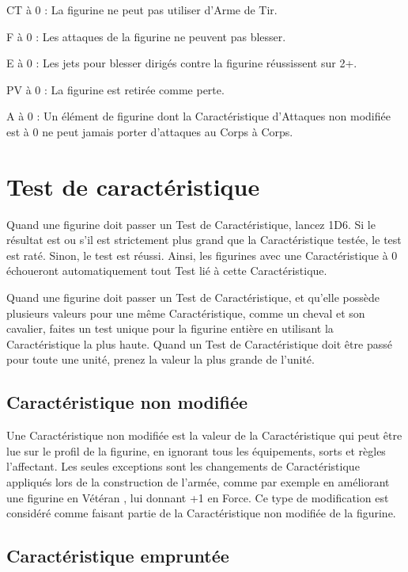 \noindent CT à 0 : La figurine ne peut pas utiliser d'Arme de Tir.

\noindent F à 0 : Les attaques de la figurine ne peuvent pas blesser.

\noindent E à 0 : Les jets pour blesser dirigés contre la figurine réussissent sur 2+.

\noindent PV à 0 : La figurine est retirée comme perte.

\noindent A à 0 : Un élément de figurine dont la Caractéristique d'Attaques non modifiée est à 0 ne peut jamais porter d'attaques au Corps à Corps.

\section{Test de caractéristique}

Quand une figurine doit passer un Test de Caractéristique, lancez 1D6. Si le résultat est  ou s'il est strictement plus grand que la Caractéristique testée, le test est raté. Sinon, le test est réussi. Ainsi, les figurines avec une Caractéristique à 0 échoueront automatiquement tout Test lié à cette Caractéristique.

Quand une figurine doit passer un Test de Caractéristique, et qu'elle possède plusieurs valeurs pour une même Caractéristique, comme un cheval et son cavalier, faites un test unique pour la figurine entière en utilisant la Caractéristique la plus haute. Quand un Test de Caractéristique doit être passé pour toute une unité, prenez la valeur la plus grande de l'unité.

\subsection{Caractéristique non modifiée}

Une Caractéristique non modifiée est la valeur de la Caractéristique qui peut être lue sur le profil de la figurine, en ignorant tous les équipements, sorts et règles l'affectant. Les seules exceptions sont les changements de Caractéristique appliqués lors de la construction de l'armée, comme par exemple en améliorant une figurine en \og Vétéran \fg{}, lui donnant +1 en Force. Ce type de modification est considéré comme faisant partie de la Caractéristique non modifiée de la figurine.

\subsection{Caractéristique empruntée}

